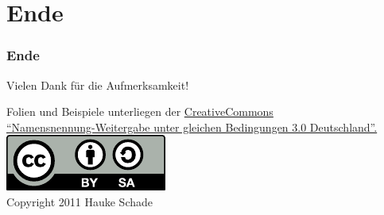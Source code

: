 
\section{Ende}
\begin{frame}
    \frametitle{Ende}

    \begin{center}
        Vielen Dank für die Aufmerksamkeit!
        
        \begin{scriptsize}
            Folien und Beispiele unterliegen der
            \href{http://creativecommons.org/licenses/by-sa/3.0/de/}{CreativeCommons \\
            "`Namensnennung-Weitergabe unter gleichen Bedingungen 3.0 Deutschland"'.\\[1em]
            \includegraphics[scale=0.5]{Bilder/cc-by-sa-gross.pdf}}\\[2em]
            
            Copyright 2011 Hauke Schade
        \end{scriptsize}
    \end{center}

\end{frame}    
